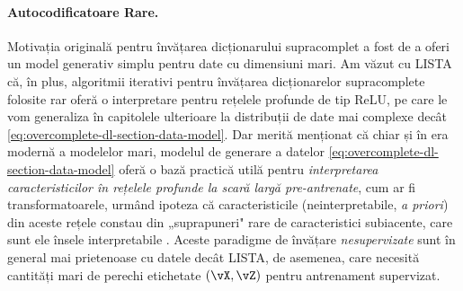 \documentclass[../../book-main_ro.tex]{subfiles}
\begin{document}
\paragraph{Autocodificatoare Rare.}
Motivația originală pentru învățarea dicționarului supracomplet a fost de a oferi
un model generativ simplu pentru date cu dimensiuni mari. Am văzut cu LISTA că, în
plus, algoritmii iterativi pentru învățarea dicționarelor supracomplete folosite rar
oferă o interpretare pentru rețelele profunde de tip ReLU, pe care le vom
generaliza în capitolele ulterioare la distribuții de date mai complexe decât
\eqref{eq:overcomplete-dl-section-data-model}.
Dar merită menționat că chiar și în era modernă a modelelor mari, modelul
de generare a datelor \eqref{eq:overcomplete-dl-section-data-model} oferă o bază
practică utilă pentru
\textit{interpretarea caracteristicilor în rețelele profunde la scară largă pre-antrenate}, cum ar fi
transformatoarele, urmând ipoteza că caracteristicile (neinterpretabile, \textit{a
priori}) din aceste rețele constau din „suprapuneri" rare de
caracteristici subiacente, care sunt ele însele interpretabile
\cite{elhage2022superposition}. Aceste paradigme de învățare \textit{nesupervizate}
sunt în general mai prietenoase cu datele decât LISTA, de asemenea, care necesită cantități mari
de perechi etichetate $(\vX, \vZ)$ pentru antrenament supervizat.
\end{document}
